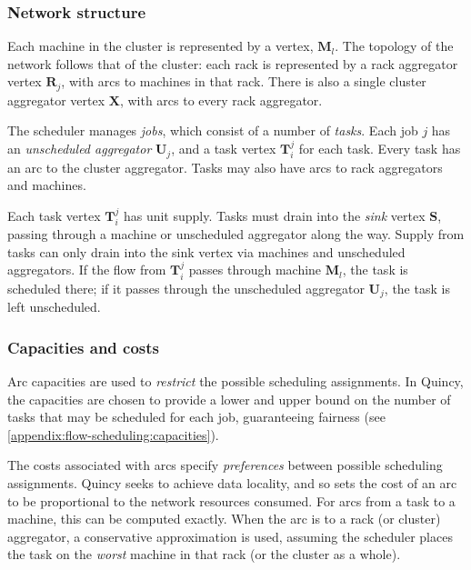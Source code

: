 
\subsubsection{Network structure}

Each machine in the cluster is represented by a vertex, $\mathbf{M}_l$. The topology of the network follows that of the cluster: each rack is represented by a rack aggregator vertex $\mathbf{R}_j$, with arcs to  machines in that rack. There is also a single cluster aggregator vertex $\mathbf{X}$, with arcs to every rack aggregator.

The scheduler manages \emph{jobs}, which consist of a number of \emph{tasks}. Each job $j$ has an \emph{unscheduled aggregator} $\mathbf{U}_j$, and a task vertex $\mathbf{T}_i^j$ for each task. Every task has an arc to the cluster aggregator. Tasks may also have arcs to rack aggregators and machines.

Each task vertex $\mathbf{T}_i^j$ has unit supply. Tasks must drain into the \emph{sink} vertex $\mathbf{S}$, passing through a machine or unscheduled aggregator along the way\footnotemark.  Supply from tasks can only drain into the sink vertex via machines and unscheduled aggregators. If the flow from $\mathbf{T}_i^j$ passes through machine $\mathbf{M}_l$, the task is scheduled there; if it passes through the unscheduled aggregator $\mathbf{U}_j$, the task is left unscheduled.

\subsubsection{Capacities and costs}
Arc capacities are used to \emph{restrict} the possible scheduling assignments. In Quincy, the capacities are chosen to provide a lower and upper bound on the number of tasks that may be scheduled for each job, guaranteeing fairness (see \cref{appendix:flow-scheduling:capacities}).

The costs associated with arcs specify \emph{preferences} between possible scheduling assignments. Quincy seeks to achieve data locality, and so sets the cost of an arc to be proportional to the network resources consumed. For arcs from a task to a machine, this can be computed exactly. When the arc is to a rack (or cluster) aggregator, a conservative approximation is used, assuming the scheduler places the task on the \emph{worst} machine in that rack (or the cluster as a whole).

